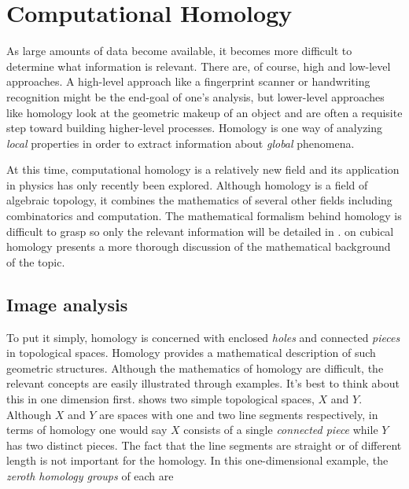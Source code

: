 \chapter{Computational Homology}

As large amounts of data become available, it becomes more difficult to determine what information is relevant. There are, of course, high and low-level approaches. A high-level approach like a fingerprint scanner or handwriting recognition might be the end-goal of one's analysis, but lower-level approaches like homology look at the geometric makeup of an object and are often a requisite step toward building higher-level processes. Homology is one way of analyzing \textit{local} properties in order to extract information about \textit{global} phenomena.

	At this time, computational homology is a relatively new field and its application in physics has only recently been explored. Although homology is a field of algebraic topology, it combines the mathematics of several other fields including combinatorics and computation. The mathematical formalism behind homology is difficult to grasp so only the relevant information will be detailed in .  on cubical homology presents a more thorough discussion of the mathematical background of the topic.
		
\section{Image analysis} \label{ch2:imageanalysis}

To put it simply, homology is concerned with enclosed \textit{holes} and connected \textit{pieces} in topological spaces. Homology provides a mathematical description of such geometric structures. Although the mathematics of homology are difficult, the relevant concepts are easily illustrated through examples. It's best to think about this in one dimension first.  shows two simple topological spaces, $X$ and $Y$. Although $X$ and $Y$ are spaces with one and two line segments respectively, in terms of homology one would say $X$ consists of a single \textit{connected piece} while $Y$ has two distinct pieces. The fact that the line segments are straight or of different length is not important for the homology. In this one-dimensional example, the \textit{zeroth homology groups} of each are


